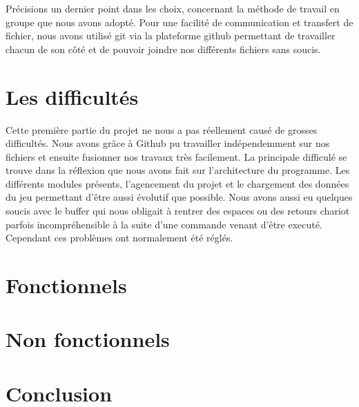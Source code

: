 \documentclass[10pt,a4paper,twocolumn]{report}
\begin{document}
Précisions un dernier point dans les choix, concernant la méthode de travail en groupe que nous avons adopté. Pour une facilité de communication et transfert de fichier, nous avons utilisé git via la plateforme github permettant de travailler chacun de son côté et de pouvoir joindre nos différents fichiers sans soucis.

\section{Les difficultés}

Cette première partie du projet ne nous a pas réellement causé de grosses difficultés. Nous avons grâce à Github pu travailler indépendemment sur nos fichiers et ensuite fusionner nos travaux très facilement.
La principale difficulé se trouve dans la réflexion que nous avons fait sur l'architecture du programme. Les différents modules présents, l'agencement du projet et le chargement des données du jeu permettant d'être aussi évolutif que possible.
Nous avons aussi eu quelques soucis avec le buffer qui nous obligait à rentrer des espaces ou des retours chariot parfois incompréhensible à la suite d'une commande venant d'être executé. Cependant ces problèmes ont normalement été réglés.

\section{Fonctionnels}

\section{Non fonctionnels}

\section{Conclusion}
\end{document}
